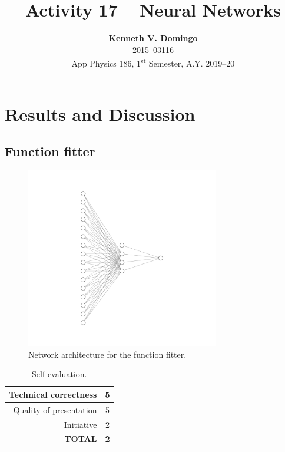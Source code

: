 \documentclass[12pt,a4paper]{article}
\newcommand{\activity}{Activity 17 -- Neural Networks}
\begin{document}
\title{\TitleFont \activity}
\author[ ]{\textbf{Kenneth V. Domingo} \\
2015--03116 \\
App Physics 186, 1\textsuperscript{st} Semester, A.Y. 2019--20}

\maketitle
\thispagestyle{titlestyle}

\section*{Results and Discussion}
\setcounter{section}{1}
\subsection{Function fitter}

\begin{figure}[htb]
	\centering
	\includegraphics[width=0.75\textwidth]{func-fit.png}
	\caption{Network architecture for the function fitter.}
\end{figure}

\clearpage
\begin{table}[!htb]
	\centering
	\caption{Self-evaluation.}
	\begin{tabular}{||r|c||}
		\hline
		Technical correctness & 5 \\ \hline
		Quality of presentation & 5 \\ \hline
		Initiative & 2 \\ \hline
		\textbf{TOTAL} & \textbf{2} \\ \hline
	\end{tabular}
	\label{tab:self-eval}
\end{table}



\end{document}
